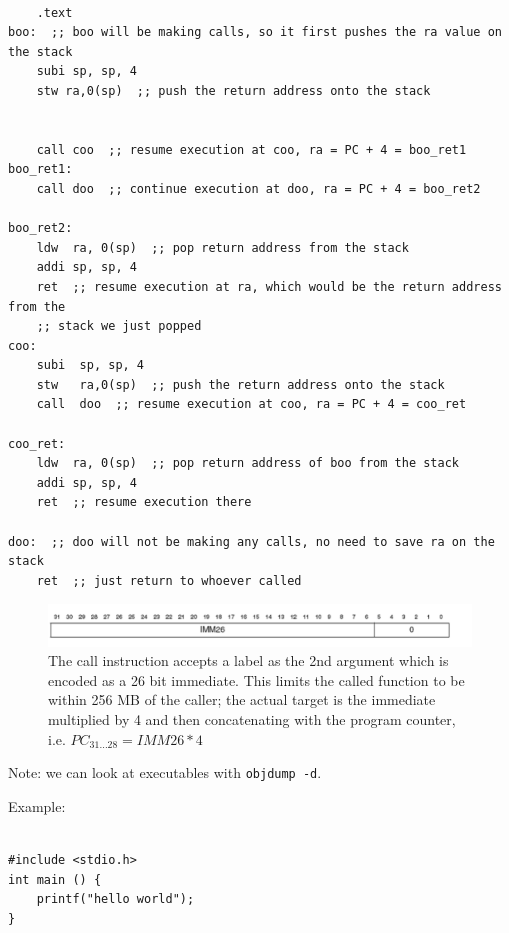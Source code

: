 \documentclass[../notes.tex]{subfiles}
\begin{document}
\begin{listing}[H]
\begin{verbatim}

	.text
boo:  ;; boo will be making calls, so it first pushes the ra value on the stack   
	subi sp, sp, 4  
	stw ra,0(sp)  ;; push the return address onto the stack


	call coo  ;; resume execution at coo, ra = PC + 4 = boo_ret1
boo_ret1:
	call doo  ;; continue execution at doo, ra = PC + 4 = boo_ret2

boo_ret2:                                        
	ldw  ra, 0(sp)  ;; pop return address from the stack
	addi sp, sp, 4
	ret  ;; resume execution at ra, which would be the return address from the 
	;; stack we just popped
coo:
	subi  sp, sp, 4 
	stw   ra,0(sp)  ;; push the return address onto the stack
	call  doo  ;; resume execution at coo, ra = PC + 4 = coo_ret

coo_ret:
	ldw  ra, 0(sp)  ;; pop return address of boo from the stack
	addi sp, sp, 4
	ret  ;; resume execution there

doo:  ;; doo will not be making any calls, no need to save ra on the stack
	ret  ;; just return to whoever called 
\end{verbatim}
\end{listing}





\begin{figure}[H]
	\centering
	\includegraphics[width=0.8\linewidth]{img/image_2022-09-26-14-48-27.png}
	\caption{The call instruction accepts a label as the 2nd argument which is encoded as a 26 bit immediate. This limits the called function to be within 256 MB of the caller; the actual target is the immediate multiplied by 4 and then concatenating with the program counter, i.e. $ PC_{31\ldots28} = IMM26 * 4 $ }
\end{figure}

Note: we can look at executables with \texttt{objdump -d}. 

Example:


\begin{listing}[H]
\begin{verbatim}

#include <stdio.h>
int main () {
	printf("hello world");
}

\end{verbatim}
\end{listing}
\end{document}
